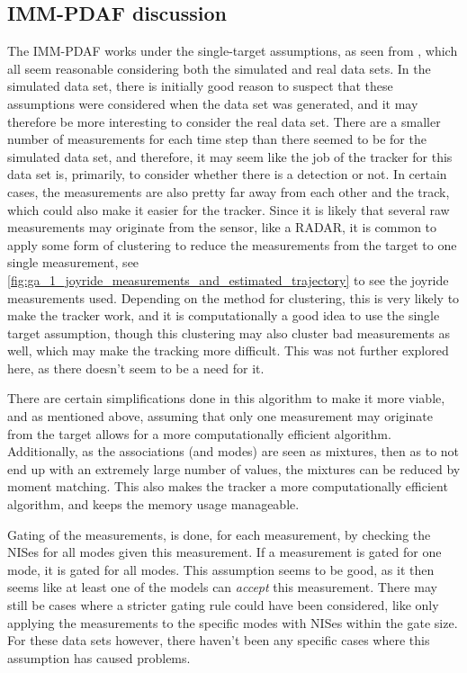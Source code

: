 \subsection{IMM-PDAF discussion}
The IMM-PDAF works under the single-target assumptions, as seen from \cite[p. 105]{Edmund}, which all seem reasonable considering both the simulated and real data sets. In the simulated data set, there is initially good reason to suspect that these assumptions were considered when the data set was generated, and it may therefore be more interesting to consider the real data set. There are a smaller number of measurements for each time step than there seemed to be for the simulated data set, and therefore, it may seem like the job of the tracker for this data set is, primarily, to consider whether there is a detection or not. In certain cases, the measurements are also pretty far away from each other and the track, which could also make it easier for the tracker. Since it is likely that several raw measurements may originate from the sensor, like a RADAR, it is common to apply some form of clustering to reduce the measurements from the target to one single measurement, see \cref{fig:ga_1_joyride_measurements_and_estimated_trajectory} to see the joyride measurements used. Depending on the method for clustering, this is very likely to make the tracker work, and it is computationally a good idea to use the single target assumption, though this clustering may also cluster bad measurements as well, which may make the tracking more difficult. This was not further explored here, as there doesn't seem to be a need for it. 

There are certain simplifications done in this algorithm to make it more viable, and as mentioned above, assuming that only one measurement may originate from the target allows for a more computationally efficient algorithm. Additionally, as the associations (and modes) are seen as mixtures, then as to not end up with an extremely large number of values, the mixtures can be reduced by moment matching. This also makes the tracker a more computationally efficient algorithm, and keeps the memory usage manageable. 

Gating of the measurements, is done, for each measurement, by checking the NISes for all modes given this measurement. If a measurement is gated for one mode, it is gated for all modes. This assumption seems to be good, as it then seems like at least one of the models can \textit{accept} this measurement. There may still be cases where a stricter gating rule could have been considered, like only applying the measurements to the specific modes with NISes within the gate size. For these data sets however, there haven't been any specific cases where this assumption has caused problems. 

